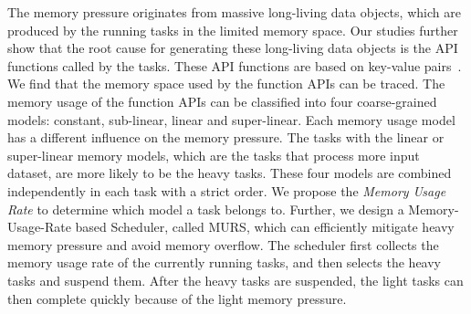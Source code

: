 The memory pressure originates from massive long-living data objects, which are produced by the running tasks in the limited memory space. Our studies further show that the root cause for generating these long-living data objects is the API functions called by the tasks. These API functions are based on key-value pairs~\cite{dean2008mapreduce, zaharia2012resilient, hueske2012opening, isard2007dryad}. We find that the memory space used by the function APIs can be traced. The memory usage of the function APIs can be classified into four coarse-grained models: constant, sub-linear, linear and super-linear. Each memory usage model has a different influence on the memory pressure. The tasks with the linear or super-linear memory models, which are the tasks that process more input dataset, are more likely to be the heavy tasks. These four models are combined independently in each task with a strict order. We propose the \textit{Memory Usage Rate} to determine which model a task belongs to. Further, we design a Memory-Usage-Rate based Scheduler, called MURS, which can efficiently mitigate heavy memory pressure and avoid memory overflow. The scheduler first collects the memory usage rate of the currently running tasks, and then selects the heavy tasks and suspend them. After the heavy tasks are suspended, the light tasks can then complete quickly because of the light memory pressure.


